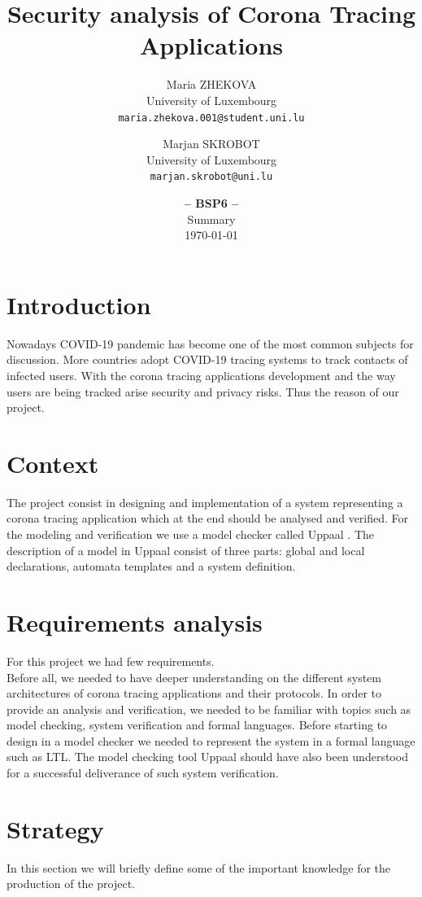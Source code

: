 \documentclass[a4paper, twocolumn]{article}
\title{\textbf{Security analysis of Corona Tracing Applications}}
\date{\textbf{-- BSP6 --}\\Summary\\ \today}
\author{
    Maria ZHEKOVA\\
    \small University of Luxembourg\\
    \small\texttt{maria.zhekova.001@student.uni.lu}
	\and
    Marjan SKROBOT\\
    \small University of Luxembourg\\
	\small\texttt{marjan.skrobot@uni.lu}
}
\begin{document}
\maketitle

\section{Introduction}
Nowadays COVID-19 pandemic has become one of the most common subjects for discussion. More countries adopt COVID-19 tracing systems to track contacts of infected users. With the corona tracing applications development and the way users are being tracked arise security and privacy risks. Thus the reason of our project. 
\section{Context}
The project consist in designing and implementation of a system representing a corona tracing application which at the end should be analysed and verified. For the modeling and verification we use a model checker called Uppaal \cite{uppaal}. The description of a model in Uppaal consist of three parts: global and local declarations, automata templates and a system definition.

\section{Requirements analysis} 
For this project we had few requirements.\\
Before all, we needed to have deeper understanding on the different system architectures of corona tracing applications and their protocols. In order to provide an analysis and verification, we needed to be familiar with topics such as model checking, system verification and formal languages. Before starting to design in a model checker we needed to represent the system in a formal language such as LTL. The model checking tool Uppaal should have also been understood for a successful deliverance of such system verification.

\section{Strategy}
In this section we will briefly define some of the important knowledge for the production of the project.
\end{document}
